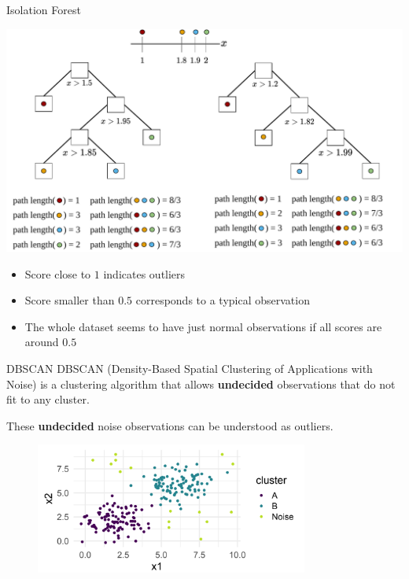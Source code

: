 \begin{vbframe}{Isolation Forest}
    \begin{center}
        \includegraphics[width=\textwidth, page=2, trim=0cm 2cm 0cm 1.5cm]{figure_man/isolation_forest.pdf}
    \end{center}
    \vspace{-0.5cm}
    \begin{itemize}
        \item Score close to $1$ indicates outliers
        \item Score smaller than $0.5$ corresponds to a typical observation
        \item The whole dataset seems to have just normal observations if all scores are around $0.5$
    \end{itemize}
\end{vbframe}

\begin{vbframe}{DBSCAN}
    DBSCAN (Density-Based Spatial Clustering of Applications with Noise) is a clustering algorithm that allows \textbf{undecided} observations that do not fit to any cluster.
    \medskip
    
    These \textbf{undecided} noise observations can be understood as outliers.
    
    \vspace*{0.5cm}
    
    
    \begin{figure}
        \includegraphics[width = 0.8\textwidth]{figure_man/dbscan.png}
    \end{figure}
    
\end{vbframe}

\endlecture


